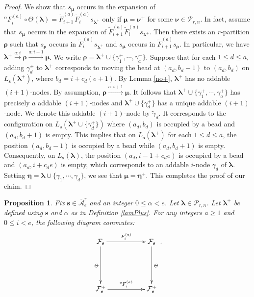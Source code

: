 \documentclass[a4paper,10pt]{amsart}
\theoremstyle{plain}
\def\bs{{\boldsymbol{s}}}
\def\PP{\mathscr{P}}
\def\blam{{\boldsymbol \lambda}}
\def\bmu{{\boldsymbol \mu}}
\def\brho{{\boldsymbol\rho}}
\def\bnu{{\boldsymbol \nu}}
\theoremstyle{plain}
\newtheorem{prop}[theorem]{Proposition}
\numberwithin{equation}{section}
\begin{document}
\begin{proof}
We show that $s_\bmu$ occurs in the expansion of ${^\alpha}\!F_i^{(a)}\circ \varTheta(\blam)=\tilde{F}^{(a)}_{i+1}\tilde{F}^{(a)}_i s_{\blam^+}$ only if $\bmu=\bnu^+$ for some $\bnu\in\PP_{r,n}$. In fact, assume that $s_\bmu$ occurs in the expansion of $\tilde{F}^{(a)}_{i+1}\tilde{F}^{(a)}_i s_{\blam^+}$. Then there exists an $r$-partition $\boldsymbol{\rho}$ such that $s_{\boldsymbol{\rho}}$ occurs in $\tilde{F}^{(a)}_i s_{\blam^+}$ and $s_\bmu$ occurs in $\tilde{F}^{(a)}_{i+1}s_{\boldsymbol{\rho}}$. In particular, we have $\blam^+\xrightarrow{a:i} {\boldsymbol{\rho}} \xrightarrow{a:i+1} \bmu$. We write $\brho=\blam^+\cup\{\gamma^+_1, \cdots, \gamma^+_a\}$.
Suppose that for each $1\leq d\leq a$, adding $\gamma^+_d$ to $\blam^+$ corresponds to moving the bead at $(a_d, b_d-1)$ to $(a_d, b_d)$ on $L_\bs(\blam^+)$, where $b_d=i+c_d(e+1)$. By Lemma \ref{no+}, $\blam^+$ has no addable $(i+1)$-nodes. By assumption, ${\boldsymbol{\rho}} \xrightarrow{a:i+1} \bmu$. It follows that $\blam^+ \cup \{\gamma^+_1, \cdots, \gamma^+_a\}$ has precisely $a$ addable $(i+1)$-nodes and $\blam^+\cup \{\gamma^+_d\}$ has a unique addable $(i+1)$-node. We denote this addable $(i+1)$-node by $\tilde \gamma_d$. It corresponds to the configuration on $L_\bs(\blam^+\cup \{\gamma^+_d\})$ where $(a_d, b_d)$ is occupied by a bead and $(a_d, b_d+1)$ is empty. This implies that on $L_\bs(\blam^+)$ for each $1\leq d\leq a$, the position $(a_d, b_d-1)$ is occupied by a bead while $(a_d, b_d+1)$ is empty.
Consequently, on $L_\bs(\blam)$, the position $(a_d, i-1+c_de)$ is occupied by a bead and $(a_d, i+c_de)$ is empty, which corresponds to an addable $i$-node $\gamma_d$ of $\blam$. Setting $\boldsymbol{\eta}=\blam\cup \{\gamma_1, \cdots, \gamma_d\}$, we see that $\bmu=\boldsymbol{\eta}^+$. This completes the proof of our claim.
\end{proof}


\begin{prop}\label{diagram commute} Fix $\bs\in \overline{\mathcal A}^r_e$ and an integer $0 \le \alpha < e$. Let $\blam\in\PP_{r,n}$. Let $\blam^+$ be defined using $\bs$ and $\alpha$ as in Definition \ref{lamPlus}.
For any integers $a\ge 1$ and $0\le i<e$, the following diagram commutes: \[ \xymatrix{
\mathcal F_\bs \ar[rr]^{F^{(a)}_i} \ar[dd]_{\varTheta} &  &\mathcal F_\bs \ar[dd]^{\varTheta} \\
&   & \\
\mathcal F_\bs^+ \ar[rr]^{{^\alpha}\!F^{(a)}_i} &  & \mathcal F_\bs^+
}.  \]
\end{prop}
\end{document}
